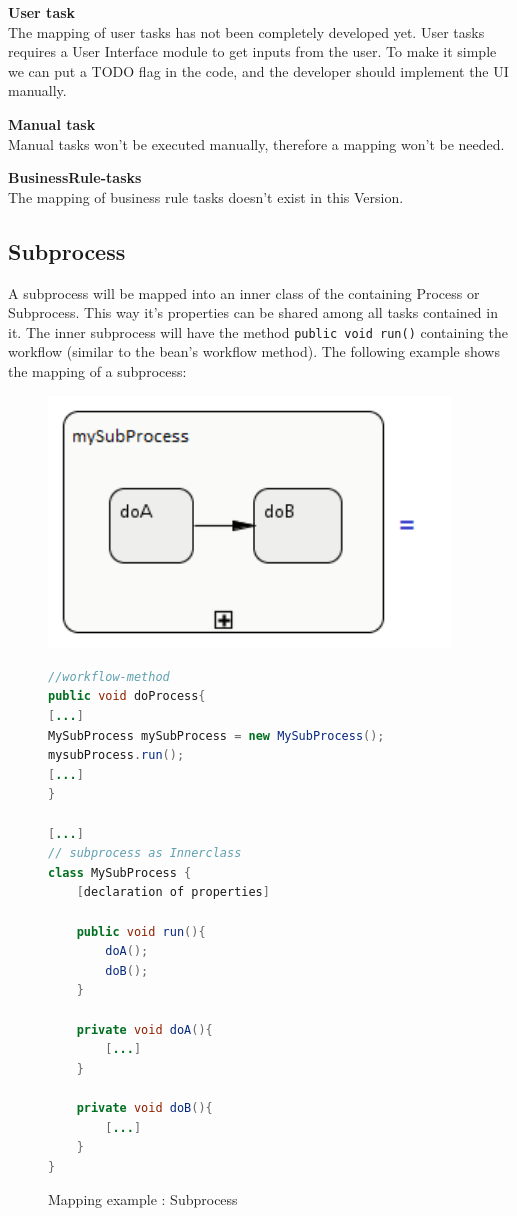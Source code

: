 \textbf{User task}\\
The mapping of user tasks has not been completely developed yet. User tasks requires a User Interface module to get inputs from the user. To make it simple we can put a TODO flag in the code, and the developer should implement the UI manually. 

\textbf{Manual task}\\
Manual tasks won't be executed manually, therefore a mapping won't be needed.

\textbf{BusinessRule-tasks}\\
The mapping of business rule tasks doesn't exist in this Version.

\subsection{Subprocess}
A subprocess will be mapped into an inner class of the containing Process or Subprocess. This way it's properties can be shared among all tasks contained in it. The inner subprocess will have the method \texttt{public void run()} containing the workflow (similar to the bean's workflow method). The following example shows the mapping of a subprocess:\\

\begin{figure}[h]
\begin{minipage}[c]{0.3\textwidth}
\includegraphics[width=0.95\textwidth]{images/mapping/subprocess.png}
\end{minipage}
\begin{minipage}[c]{0.7\textwidth}
\begin{lstlisting}[language=Java]
//workflow-method
public void doProcess{
[...]
MySubProcess mySubProcess = new MySubProcess();
mysubProcess.run();
[...]
}

[...]
// subprocess as Innerclass
class MySubProcess {
	[declaration of properties]
		
	public void run(){
		doA();
		doB();
	}
	
	private void doA(){
		[...] 
	}
	
	private void doB(){ 
		[...] 
	}
}
\end{lstlisting}
\end{minipage}
\caption{Mapping example : Subprocess}%
\label{fig:mapping_subprocess}%
\end{figure}

